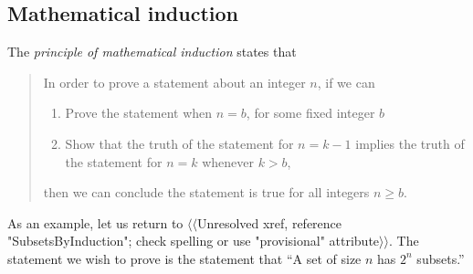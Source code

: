 \documentclass[10pt,]{book}
\theoremstyle{plain}
\theoremstyle{definition}
\numberwithin{equation}{chapter}
\begin{document}
\subsection[{Mathematical induction}]{Mathematical induction}\label{subsection-5}
\typeout{************************************************}
\typeout{************************************************}
The \emph{principle of mathematical induction} states that%
\begin{quote}In order to prove a statement about an integer \(n\), if we can \leavevmode%
\begin{enumerate}
\item\hypertarget{li-13}{}Prove the statement when \(n=b\), for some fixed integer \(b\)%
\item\hypertarget{li-14}{}Show that the truth of the statement for \(n=k-1\) implies the truth of the statement for \(n=k\) whenever \(k>b\),%
\end{enumerate}
 then we can conclude the statement is true for all integers \(n\ge
b\).\end{quote}
As an example, let us return to {$\langle\langle$Unresolved xref, reference "SubsetsByInduction"; check spelling or use "provisional" attribute$\rangle\rangle$}. The statement we wish to prove is the statement that ``A set of size \(n\) has \(2^n\) subsets.''%
\end{document}
